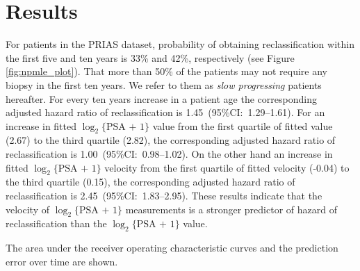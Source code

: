 \section{Results}
For patients in the PRIAS dataset, probability of obtaining reclassification within the first five and ten years is 33\% and 42\%, respectively (see Figure \ref{fig:npmle_plot}). That more than 50\% of the patients may not require any biopsy in the first ten years. We refer to them as \textit{slow progressing} patients hereafter. For every ten years increase in a patient age the corresponding adjusted hazard ratio of reclassification is 1.45~(95\%CI:~1.29--1.61). For an increase in fitted $\log_2\{\mbox{PSA + 1}\}$ value from the first quartile of fitted value (2.67) to the third quartile (2.82), the corresponding adjusted hazard ratio of reclassification is 1.00~(95\%CI:~0.98--1.02). On the other hand an increase in fitted $\log_2\{\mbox{PSA + 1}\}$ velocity from the first quartile of fitted velocity (-0.04) to the third quartile (0.15), the corresponding adjusted hazard ratio of reclassification is 2.45~(95\%CI:~1.83--2.95). These results indicate that the velocity of $\log_2\{\mbox{PSA + 1}\}$ measurements is a stronger predictor of hazard of reclassification than the $\log_2\{\mbox{PSA + 1}\}$ value.

The area under the receiver operating characteristic curves and the prediction error over time are shown.


